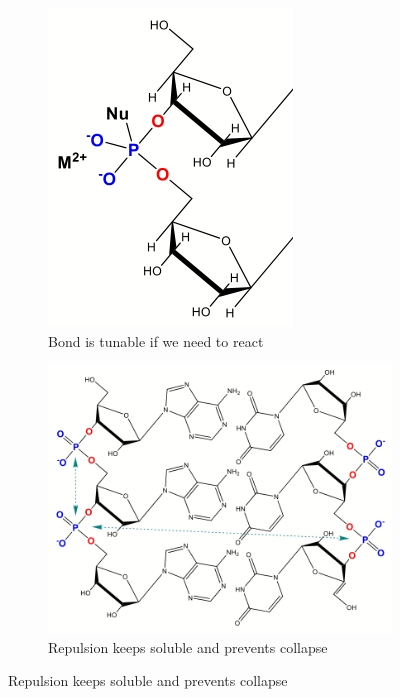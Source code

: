 \documentclass[]{article}
\begin{document}
\begin{figure}[H]
\begin{subfigure}[b]{0.45\textwidth}
	\end{subfigure}
	\begin{subfigure}[b]{0.45\textwidth}
		\centering
		\caption{Bond is tunable if we need to react}\label{fig:PhosphoDiesterBond2} 
		\includegraphics[width=\textwidth]{PhosphoDiesterBond2}
	\end{subfigure}
	\begin{subfigure}[b]{0.45\textwidth}
		\centering
		\caption{Repulsion keeps  soluble and prevents collapse}\label{fig:PhosphoDiesterBond3} 
		\includegraphics[width=\textwidth]{PhosphoDiesterBond3}
	\end{subfigure}
	
\end{figure}
\end{document}
